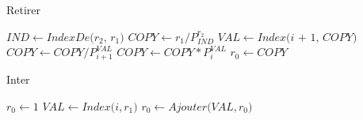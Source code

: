 \documentclass{article}
\begin{document}
    \begin{algorithm}[H]
        \caption{Retirer}\label{Retirer}
        \begin{algorithmic}
        \State $\textit{$IND$} \gets \textit{IndexDe($r_2$, $r_1$)}$
        \State $\textit{$COPY$} \gets \textit{$r_1$} / P_{IND}^{r_2}$ 
         
            \State $\textit{$VAL$} \gets \textit{Index(i + 1, COPY)}$
            \State $\textit{$COPY$} \gets \textit{$COPY$} / P_{i + 1}^{VAL}$
            \State $\textit{$COPY$} \gets \textit{$COPY$} * P_{i}^{VAL}$
        \EndFor
        \State $\textit{$r_0$} \gets COPY$
        \EndProcedure
        \end{algorithmic}
    \end{algorithm}

    \begin{algorithm}[H]
        \caption{Inter}\label{Inter}
        \begin{algorithmic}
        \State $\textit{$r_0$} \gets \text{1}$
            \State $\textit{$VAL$} \gets \textit{Index($i, r_1$)}$
             
                \State $\textit{$r_0$} \gets \textit{Ajouter($VAL, r_0$)}$
            \EndIf
        \EndFor
        \EndProcedure
        \end{algorithmic}
    \end{algorithm}
\end{document}
